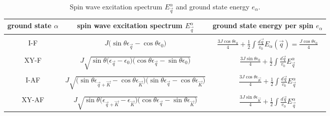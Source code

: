 \begin{table*}[t]
    \tiny
\begin{tabular}{c c  c}
\toprule
 ground state $\alpha$& \hspace{30pt} spin wave excitation spectrum $E^{\alpha}_{\vec q}$ \hspace{30pt} & \hspace{20pt} ground state energy per spin $e_{\alpha}$ \hspace{20pt} \\
 \hline
 \\
I-F& $J \big(\sin \theta \epsilon_{\vec q} - \cos \theta \epsilon_{0}\big) $&   $\displaystyle  \frac{3 J \cos \theta \epsilon_{0}}{4}  +\frac{1}{2}  \int \frac{d{\vec q}}{v_0} E_{\alpha}({\vec q})=\frac{J  \cos \theta \epsilon_{0}}{4}$\\
 \\
 XY-F & $    J\sqrt{ \sin\theta \big(\epsilon_{\vec q}-\epsilon_{0}\big)\big( \cos\theta \epsilon_{\vec q}- \sin \theta \epsilon_{0}\big)}$
&$\displaystyle   \frac{3 J \sin \theta \epsilon_{0} }{4}  +\frac{1}{2}  \int \frac{d{\vec q}}{v_0} E^{\alpha}_{\vec q}$\\
\\
 I-AF &  $ J  \sqrt{\big( \sin \theta \epsilon_{{\vec q}+{\vec K}}-\cos \theta \epsilon_{\vec K}\big) \big(\sin \theta \epsilon_{\vec q}- \cos \theta \epsilon_{\vec K }\big)}$
 &$ \displaystyle \frac{3  J \cos \theta \epsilon_{\vec K} }{4}  +\frac{1}{2}  \int \frac{d{\vec q}}{v_0} E^{\alpha}_{\vec q}$\\
 \\
 XY-AF& $  J  \sqrt{\sin \theta \big(  \epsilon_{{\vec q}+{\vec K}}-\epsilon_{\vec K} \big)\big( \cos \theta \epsilon_{\vec q}-\sin \theta \epsilon_{\vec K}\big)}$&
 $\displaystyle \frac{3 J \sin \theta \epsilon_{\vec K} }{4} + \frac{1}{2}  \int \frac{d{\vec q}}{v_0} E^{\alpha}_{\vec q}$\\
\end{tabular}
\caption{  Spin wave excitation spectrum $E_{\vec q}^{\alpha}$ and ground state energy  $e_{\alpha}$.}
\end{table*}



